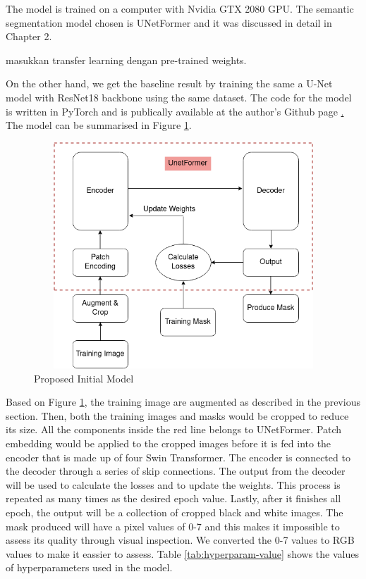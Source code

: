 The model is trained on a computer with Nvidia GTX 2080 GPU. The semantic segmentation model chosen is UNetFormer \cite{unetformer} and it was discussed in detail in Chapter 2.

masukkan transfer learning dengan pre-trained weights.

On the other hand, we get the baseline result by training the same a U-Net model with ResNet18 backbone using the same dataset. The code for the model is written in PyTorch and is publically available at the author's Github page \href{https://github.com/WangLibo1995/GeoSeg}. The model can be summarised in Figure \ref{fig:initial-model}.

\begin{figure}[!h]
\includegraphics[width=13.0cm, height=8.5cm]{images/initial model.png}
\caption{Proposed Initial Model}
\label{fig:initial-model}
\end{figure}

Based on Figure \ref{fig:initial-model}, the training image are augmented as described in the previous section. Then, both the training images and masks would be cropped to reduce its size. All the components inside the red line belongs to UNetFormer. Patch embedding would be applied to the cropped images before it is fed into the encoder that is made up of four Swin Transformer. The encoder is connected to the decoder through a series of skip connections. The output from the decoder will be used to calculate the losses and to update the weights. This process is repeated as many times as the desired epoch value. Lastly, after it finishes all epoch, the output will be a collection of cropped black and white images. The mask produced will have a pixel values of 0-7 and this makes it impossible to assess its quality through visual inspection. We converted the 0-7 values to RGB values to make it eassier to assess. Table \ref{tab:hyperparam-value} shows the values of hyperparameters used in the model.

